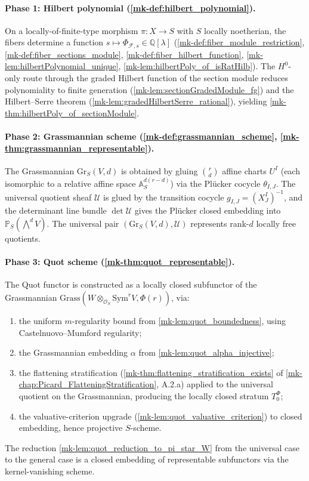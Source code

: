 \paragraph{Phase 1: Hilbert polynomial (\ref{mk-def:hilbert_polynomial}).}
On a locally-of-finite-type morphism \(\pi : X \to S\) with \(S\) locally
noetherian, the fibers determine a function
\(s \mapsto \Phi_{\mathcal{F},s} \in \mathbb{Q}[\lambda]\)
(\ref{mk-def:fiber_module_restriction}, \ref{mk-def:fiber_sections_module},
\ref{mk-def:fiber_hilbert_function}, \ref{mk-lem:hilbertPolynomial_unique},
\ref{mk-lem:hilbertPoly_of_isRatHilb}). The \(H^0\)-only route through the
  graded Hilbert function of the section module reduces polynomiality to
  finite generation (\ref{mk-lem:sectionGradedModule_fg}) and the
  Hilbert--Serre theorem (\ref{mk-lem:gradedHilbertSerre_rational}), yielding
  \ref{mk-thm:hilbertPoly_of_sectionModule}.

\paragraph{Phase 2: Grassmannian scheme (\ref{mk-def:grassmannian_scheme},
\ref{mk-thm:grassmannian_representable}).} The Grassmannian
\(\mathrm{Gr}_S(V, d)\) is obtained by gluing \(\binom{r}{d}\)
affine charts \(U^I\) (each isomorphic to a relative affine space
\(\mathbb{A}^{d(r-d)}_S\)) via the Pl\"ucker cocycle \(\theta_{I,J}\). The
universal quotient sheaf \(\mathcal{U}\) is glued by the transition cocycle
  \(g_{I,J} = (X^I_J)^{-1}\), and the determinant line bundle
  \(\det \mathcal{U}\) gives the Pl\"ucker closed embedding into
  \(\mathbb{P}_S(\bigwedge^d V)\). The universal pair
  \((\mathrm{Gr}_S(V, d), \mathcal{U})\) represents rank-\(d\) locally
  free quotients.

\paragraph{Phase 3: Quot scheme (\ref{mk-thm:quot_representable}).}
The Quot functor is constructed as a locally closed subfunctor of the
Grassmannian
\(\mathrm{Grass}(W \otimes_{\mathcal{O}_S} \mathrm{Sym}^r V, \Phi(r))\), via:
\begin{enumerate}
  \item the uniform \(m\)-regularity bound from
    \ref{mk-lem:quot_boundedness}, using Castelnuovo--Mumford regularity;
  \item the Grassmannian embedding \(\alpha\) from
    \ref{mk-lem:quot_alpha_injective};
  \item the flattening stratification (\ref{mk-thm:flattening_stratification_exists}
    of \ref{mk-chap:Picard_FlatteningStratification}, A.2.a) applied to the
    universal quotient on the Grassmannian, producing the locally closed
    stratum \(T_0^\Phi\);
  \item the valuative-criterion upgrade
    (\ref{mk-lem:quot_valuative_criterion}) to closed embedding, hence
    projective \(S\)-scheme.
\end{enumerate}
The reduction \ref{mk-lem:quot_reduction_to_pi_star_W} from the universal
case to the general case is a closed embedding of representable
subfunctors via the kernel-vanishing scheme.

